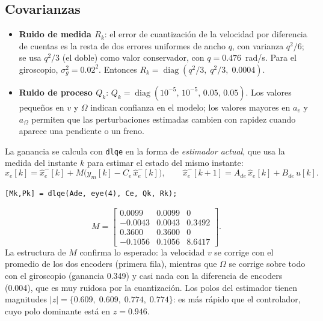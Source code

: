 \documentclass[11pt,letterpaper]{article}
\begin{document}
\subsection{Covarianzas}
\begin{itemize}
  \item \textbf{Ruido de medida $R_k$}: el error de cuantización de la velocidad por diferencia de cuentas es la resta de dos errores uniformes de ancho $q$, con varianza $q^2/6$; se usa $q^2/3$ (el doble) como valor conservador, con $q = 0.476$~rad/s. Para el giroscopio, $\sigma_g^2 = 0.02^2$. Entonces $R_k = \operatorname{diag}(q^2/3,\; q^2/3,\; 0.0004)$.
  \item \textbf{Ruido de proceso $Q_k$}: $Q_k = \operatorname{diag}(10^{-5},\,10^{-5},\,0.05,\,0.05)$. Los valores pequeños en $v$ y $\Omega$ indican confianza en el modelo; los valores mayores en $a_v$ y $a_\Omega$ permiten que las perturbaciones estimadas cambien con rapidez cuando aparece una pendiente o un freno.
\end{itemize}
La ganancia se calcula con \texttt{dlqe} en la forma de \emph{estimador actual}, que usa la medida del instante $k$ para estimar el estado del mismo instante:
\begin{equation}
  \hat x_e[k] = \hat x_e^-[k] + M\big(y_m[k] - C_e\,\hat x_e^-[k]\big),\qquad
  \hat x_e^-[k+1] = A_{de}\,\hat x_e[k] + B_{de}\,u[k].
\end{equation}
\begin{lstlisting}
[Mk,Pk] = dlqe(Ade, eye(4), Ce, Qk, Rk);
\end{lstlisting}
\begin{equation}
  M = \begin{bmatrix}
     0.0099 & 0.0099 & 0 \\
    -0.0043 & 0.0043 & 0.3492 \\
     0.3600 & 0.3600 & 0 \\
    -0.1056 & 0.1056 & 8.6417
  \end{bmatrix}.
\end{equation}
La estructura de $M$ confirma lo esperado: la velocidad $v$ se corrige con el promedio de los dos encoders (primera fila), mientras que $\Omega$ se corrige sobre todo con el giroscopio (ganancia 0.349) y casi nada con la diferencia de encoders (0.004), que es muy ruidosa por la cuantización. Los polos del estimador tienen magnitudes $|z| = \{0.609,\;0.609,\;0.774,\;0.774\}$: es más rápido que el controlador, cuyo polo dominante está en $z=0.946$.

\end{document}
